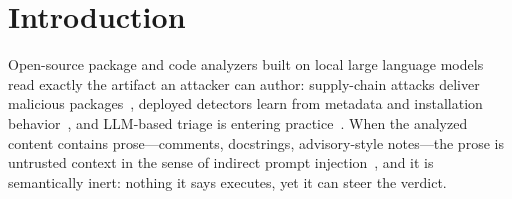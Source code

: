 \documentclass[sigconf,nonacm]{acmart}
\begin{document}

\maketitle

\section{Introduction}\label{sec:intro}
Open-source package and code analyzers built on local large language models
read exactly the artifact an attacker can author: supply-chain attacks
deliver malicious packages~\cite{ladisa2023sok,ohm2020backstabbers,
duan2021maloss}, deployed detectors learn from metadata and installation
behavior~\cite{huang2024donapi,zhang2025cerebro,gao2025malguard,
halder2024memptec}, and LLM-based triage is entering
practice~\cite{zahan2025npm,han2023howfar,sun2024llm4vuln}. When the
analyzed content contains prose---comments, docstrings, advisory-style
notes---the prose is untrusted context in the sense of indirect prompt
injection~\cite{yi2023bipia,liu2024autopi}, and it is semantically inert:
nothing it says executes, yet it can steer the verdict.
\end{document}
